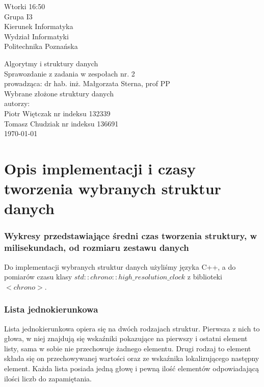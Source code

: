 \documentclass[polish,polish,a4paper]{article}
\begin{document}
	
\begin{spacing}{1.5}
		\begin{titlepage}
			\begin{flushright}
				{ Wtorki 16:50\\
					Grupa I3\\
					Kierunek Informatyka\\
					Wydział Informatyki\\
					Politechnika Poznańska}
			\end{flushright}
		\vspace*{\fill}
		\begin{center}
			{\Large Algorytmy i struktury danych \\[0.1cm]
				Sprawozdanie z zadania w zespołach nr. 2\\[0.1cm]
				prowadząca: dr hab. inż. Małgorzata Sterna, prof PP}\\
			{\Huge Wybrane złożone struktury danych\\ [0.4cm]}
			{\large autorzy:\\[0.1cm]}
			{\large Piotr Więtczak nr indeksu 132339\\[0.1cm] Tomasz Chudziak nr indeksu 136691}\\[0.5cm]
			\today
		\end{center}
		\vspace*{\fill}
	\end{titlepage}

\section{Opis implementacji i czasy tworzenia wybranych struktur danych}
	\subsubsection*{Wykresy przedstawiające średni czas tworzenia struktury, w milisekundach, od rozmiaru zestawu danych}
	
Do implementacji wybranych struktur danych użyliśmy języka C++, a do pomiarów czasu klasy $ std::chrono::high\_resolution\_clock $  z biblioteki $<chrono>$.

\subsubsection*{Lista jednokierunkowa}
Lista jednokierunkowa opiera się na dwóch rodzajach struktur. Pierwsza z nich to głowa, w niej znajdują się wskaźniki pokazujące na pierwszy i ostatni element listy, sama w sobie nie przechowuje żadnego elementu. Drugi rodzaj to element składa się on przechowywanej wartości oraz ze wskaźnika lokalizującego następny element. Każda lista posiada jedną głowę i pewną ilość elementów odpowiadającą ilości liczb do zapamiętania.


\end{spacing}
\end{document}
